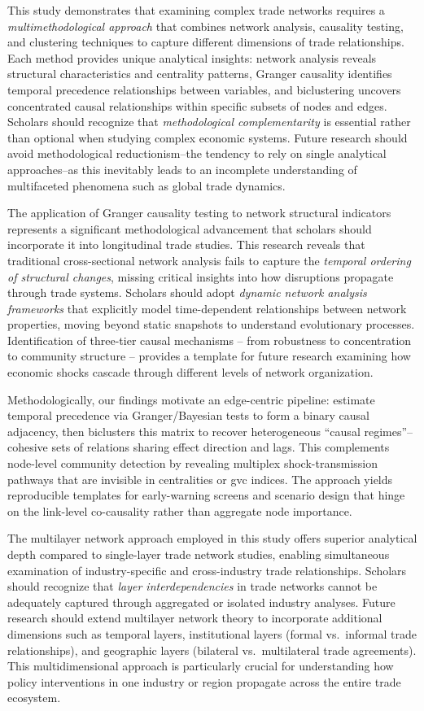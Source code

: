 \documentclass[preprint, 3p,
authoryear]{elsarticle} %
\begin{document}
This study demonstrates that examining complex trade networks requires a
\emph{multimethodological approach} that combines network analysis,
causality testing, and clustering techniques to capture different
dimensions of trade relationships. Each method provides unique
analytical insights: network analysis reveals structural characteristics
and centrality patterns, Granger causality identifies temporal
precedence relationships between variables, and biclustering uncovers
concentrated causal relationships within specific subsets of nodes and
edges. Scholars should recognize that \emph{methodological
complementarity} is essential rather than optional when studying complex
economic systems. Future research should avoid methodological
reductionism--the tendency to rely on single analytical approaches--as
this inevitably leads to an incomplete understanding of multifaceted
phenomena such as global trade dynamics.

The application of Granger causality testing to network structural
indicators represents a significant methodological advancement that
scholars should incorporate it into longitudinal trade studies. This
research reveals that traditional cross-sectional network analysis fails
to capture the \emph{temporal ordering of structural changes}, missing
critical insights into how disruptions propagate through trade systems.
Scholars should adopt \emph{dynamic network analysis frameworks} that
explicitly model time-dependent relationships between network
properties, moving beyond static snapshots to understand evolutionary
processes. Identification of three-tier causal mechanisms -- from
robustness to concentration to community structure -- provides a
template for future research examining how economic shocks cascade
through different levels of network organization.

Methodologically, our findings motivate an edge-centric pipeline:
estimate temporal precedence via Granger/Bayesian tests to form a binary
causal adjacency, then biclusters this matrix to recover heterogeneous
``causal regimes''--cohesive sets of relations sharing effect direction
and lags. This complements node-level community detection by revealing
multiplex shock-transmission pathways that are invisible in centralities
or \gls{gvc} indices. The approach yields reproducible templates for
early-warning screens and scenario design that hinge on the link-level
co-causality rather than aggregate node importance.

The multilayer network approach employed in this study offers superior
analytical depth compared to single-layer trade network studies,
enabling simultaneous examination of industry-specific and
cross-industry trade relationships. Scholars should recognize that
\emph{layer interdependencies} in trade networks cannot be adequately
captured through aggregated or isolated industry analyses. Future
research should extend multilayer network theory to incorporate
additional dimensions such as temporal layers, institutional layers
(formal vs.~informal trade relationships), and geographic layers
(bilateral vs.~multilateral trade agreements). This multidimensional
approach is particularly crucial for understanding how policy
interventions in one industry or region propagate across the entire
trade ecosystem.
\end{document}

